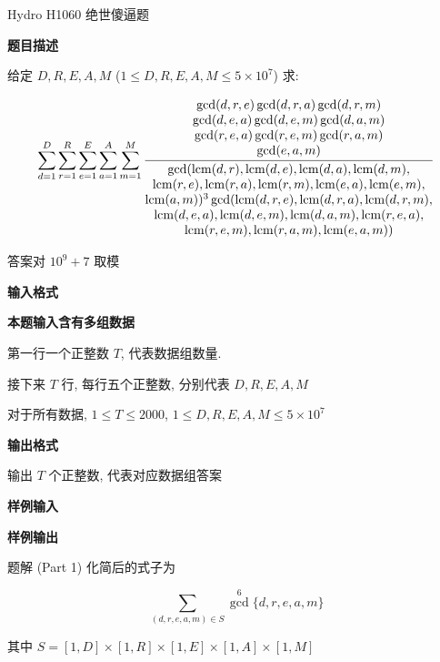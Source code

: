 \begin{frame}{Hydro H1060 绝世傻逼题}
	\label{mulf:example:hydroh1060}

	\textbf{题目描述}

	给定 \(D,R,E,A,M\) (\(1\le D,R,E,A,M\le5\times10^7\)) 求:

	\begin{equation}
		\sum_{d=1}^D\sum_{r=1}^R\sum_{e=1}^E\sum_{a=1}^A\sum_{m=1}^M\frac{\begin{matrix}
				\gcd(d,r,e)\gcd(d,r,a)\gcd(d,r,m) \\
				\gcd(d,e,a)\gcd(d,e,m)\gcd(d,a,m) \\
				\gcd(r,e,a)\gcd(r,e,m)\gcd(r,a,m) \\
				\gcd(e,a,m)
			\end{matrix}}{\begin{matrix}
				\gcd(\operatorname{lcm}(d,r),\operatorname{lcm}(d,e),\operatorname{lcm}(d,a),\operatorname{lcm}(d,m),         \\
				\operatorname{lcm}(r,e),\operatorname{lcm}(r,a),\operatorname{lcm}(r,m),\operatorname{lcm}(e,a),\operatorname{lcm}(e,m),    \\
				\operatorname{lcm}(a,m))^3\gcd(\operatorname{lcm}(d,r,e),\operatorname{lcm}(d,r,a),\operatorname{lcm}(d,r,m), \\
				\operatorname{lcm}(d,e,a),\operatorname{lcm}(d,e,m),\operatorname{lcm}(d,a,m),\operatorname{lcm}(r,e,a),      \\
				\operatorname{lcm}(r,e,m),\operatorname{lcm}(r,a,m),\operatorname{lcm}(e,a,m))
			\end{matrix}}
	\end{equation}

	答案对 \(10^9+7\) 取模

	\textbf{输入格式}

	\textbf{本题输入含有多组数据}

	第一行一个正整数 \(T\), 代表数据组数量.

	接下来 \(T\) 行, 每行五个正整数, 分别代表 \(D,R,E,A,M\)

	对于所有数据, \(1\le T\le2000\), \(1\le D,R,E,A,M\le5\times10^7\)

	\textbf{输出格式}

	输出 \(T\) 个正整数, 代表对应数据组答案

	\textbf{样例输入}


	\textbf{样例输出}

\end{frame}


\begin{frame}{题解 (Part 1)}
	化简后的式子为

	\begin{equation}
		\label{mulf:eq:hydroh1060-1}
		\sum_{(d,r,e,a,m)\in S}{\gcd}^6\{d,r,e,a,m\}
	\end{equation}

	其中 \(S=[1,D]\times[1,R]\times[1,E]\times[1,A]\times[1,M]\)
\end{frame}



